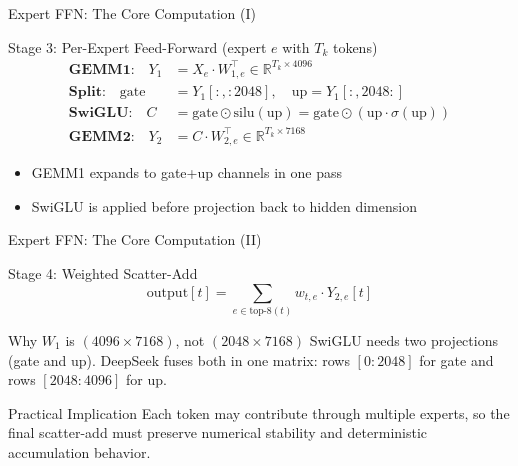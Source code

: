 \documentclass[aspectratio=169,11pt]{beamer}
\begin{document}
\begin{frame}[t]{Expert FFN: The Core Computation (I)}
\small
\begin{block}{Stage 3: Per-Expert Feed-Forward (expert $e$ with $T_k$ tokens)}
\vspace{-0.2cm}
\begin{align}
\textbf{GEMM1:} \quad Y_1 &= X_e \cdot W_{1,e}^\top
\in \mathbb{R}^{T_k \times 4096} \\
\textbf{Split:} \quad \text{gate} &= Y_1[:, :2048], \quad \text{up}=Y_1[:, 2048:] \\
\textbf{SwiGLU:} \quad C &= \text{gate} \odot \text{silu}(\text{up})
= \text{gate} \odot (\text{up}\cdot\sigma(\text{up})) \\
\textbf{GEMM2:} \quad Y_2 &= C \cdot W_{2,e}^\top
\in \mathbb{R}^{T_k \times 7168}
\end{align}
\end{block}

\begin{itemize}
    \item GEMM1 expands to gate+up channels in one pass
    \item SwiGLU is applied before projection back to hidden dimension
\end{itemize}
\end{frame}

\begin{frame}[t]{Expert FFN: The Core Computation (II)}
\small
\begin{block}{Stage 4: Weighted Scatter-Add}
\vspace{-0.2cm}
\begin{equation}
\text{output}[t] = \sum_{e \in \text{top-8}(t)} w_{t,e} \cdot Y_{2,e}[t]
\end{equation}
\end{block}

\begin{exampleblock}{Why $W_1$ is $(4096 \times 7168)$, not $(2048 \times 7168)$}
SwiGLU needs two projections (gate and up). DeepSeek fuses both in one matrix:
rows $[0{:}2048]$ for gate and rows $[2048{:}4096]$ for up.
\end{exampleblock}

\begin{alertblock}{Practical Implication}
Each token may contribute through multiple experts, so the final scatter-add must preserve numerical stability and deterministic accumulation behavior.
\end{alertblock}
\end{frame}
\end{document}
